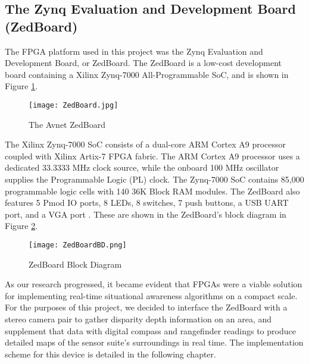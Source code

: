 \subsection{The Zynq Evaluation and Development Board (ZedBoard)}
The FPGA platform used in this project was the Zynq Evaluation and Development Board, or ZedBoard. The ZedBoard is a low-cost development board containing a Xilinx Zynq-7000 All-Programmable SoC, and is shown in Figure \ref{zedboard_pic}.

\begin{figure}[H]
	\centerline{\texttt{[image: ZedBoard.jpg]}}
	\caption{The Avnet ZedBoard \cite{zedboard_photo}}
	\label{zedboard_pic}
\end{figure}

The Xilinx Zynq-7000 SoC consists of a dual-core ARM Cortex A9 processor coupled with Xilinx Artix-7 FPGA fabric. The ARM Cortex A9 processor uses a dedicated 33.3333 MHz clock source, while the onboard 100 MHz oscillator supplies the Programmable Logic (PL) clock. The Zynq-7000 SoC contains 85,000 programmable logic cells with 140 36K Block RAM modules. The ZedBoard also features 5 Pmod IO ports, 8 LEDs, 8 switches, 7 push buttons, a USB UART port, and a VGA port \cite{zedboard_datasheet}. These are shown in the ZedBoard's block diagram in Figure \ref{zedboardbd}.

\begin{figure}[H]
	\centerline{\texttt{[image: ZedBoardBD.png]}}
	\caption{ZedBoard Block Diagram \cite{zedboard_datasheet}}
	\label{zedboardbd}
\end{figure}
\par
As our research progressed, it became evident that FPGAs were a viable solution for implementing real-time situational awareness algorithms on a compact scale. For the purposes of this project, we decided to interface the ZedBoard with a stereo camera pair to gather disparity depth information on an area, and supplement that data with digital compass and rangefinder readings to produce detailed maps of the sensor suite's surroundings in real time. The implementation scheme for this device is detailed in the following chapter.





